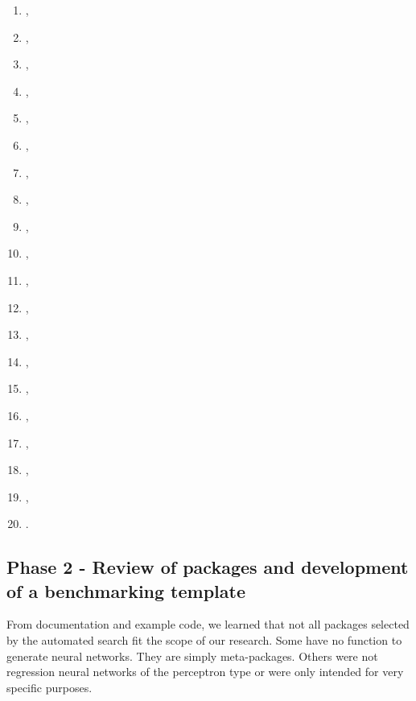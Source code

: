 \begin{enumerate}
\item
   \citep{R-rasclass},
\item
   \citep{R-rcane},
\item
   \citep{R-regressoR},
\item
   \citep{R-rminer},
\item
   \citep{R-rnn},
\item
   \citep{R-RSNNS},
\item
   \citep{R-ruta},
\item
   \citep{R-simpleNeural},
\item
   \citep{R-snnR},
\item
   \citep{R-softmaxreg},
\item
   \citep{R-Sojourn.Data},
\item
   \citep{R-spnn},
\item
   \citep{R-TeachNet},
\item
   \citep{R-tensorflow},
\item
   \citep{R-tfestimators},
\item
   \citep{R-trackdem},
\item
   \citep{R-TrafficBDE},
\item
   \citep{R-tsensembler},
\item
   \citep{R-validann},
\item
   \citep{R-zFactor}.
\end{enumerate}

\hypertarget{phase-2---review-of-packages-and-development-of-a-benchmarking-template}{%
\subsection{Phase 2 - Review of packages and development of a
benchmarking
template}\label{phase-2---review-of-packages-and-development-of-a-benchmarking-template}}

From documentation and example code, we learned that not all packages
selected by the automated search fit the scope of our research. Some
have no function to generate neural networks. They are simply
meta-packages. Others were not regression neural networks of the
perceptron type or were only intended for very specific purposes.

